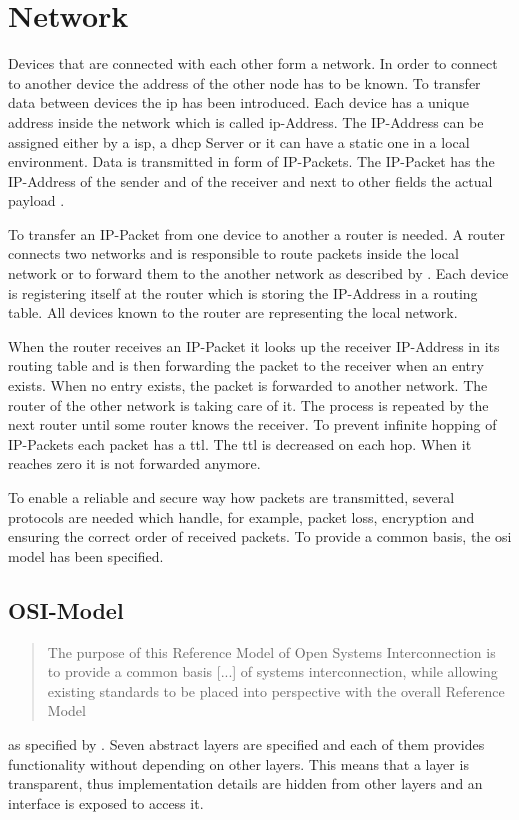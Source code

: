 \section{Network}
Devices that are connected with each other form a network. In order to connect to another device the address of the other node has to be known. To transfer data between devices the \gls{ip} has been introduced. Each device has a unique address inside the network which is called \gls{ip}-Address. The IP-Address can be assigned either by a \gls{isp}, a \gls{dhcp} Server or it can have a static one in a local environment. 
Data is transmitted in form of IP-Packets. The IP-Packet has the IP-Address of the sender and of the receiver and next to other fields the actual payload \cite{roberts}.

To transfer an IP-Packet from one device to another a router is needed. A router connects two networks and is responsible to route packets inside the local network or to forward them to the another network as described by \citet{shuler2002}.
Each device is registering itself at the router which is storing the IP-Address in a routing table. All devices known to the router are representing the local network. 

When the router receives an IP-Packet it looks up the receiver IP-Address in its routing table and is then forwarding the packet to the receiver when an entry exists.
When no entry exists, the packet is forwarded to another network. The router of the other network is taking care of it. The process is repeated by the next router until some router knows the receiver.
To prevent infinite hopping of IP-Packets each packet has a \gls{ttl}. The \gls{ttl} is decreased on each hop. When it reaches zero it is not forwarded anymore. 

To enable a reliable and secure way how packets are transmitted, several protocols are needed which handle, for example, packet loss, encryption and ensuring the correct order of received packets. 
To provide a common basis, the \gls{osi} model has been specified.

\subsection{OSI-Model}
\blockquote{The purpose of this Reference Model of Open Systems Interconnection is to provide a common basis [...] of systems interconnection, while allowing existing standards to be placed into perspective with the overall Reference Model} as specified by \citet{ISO1064-osi-model}. Seven abstract layers are specified and each of them provides functionality without depending on other layers. This means that a layer is transparent, thus implementation details are hidden from other layers and an interface is exposed to access it.

